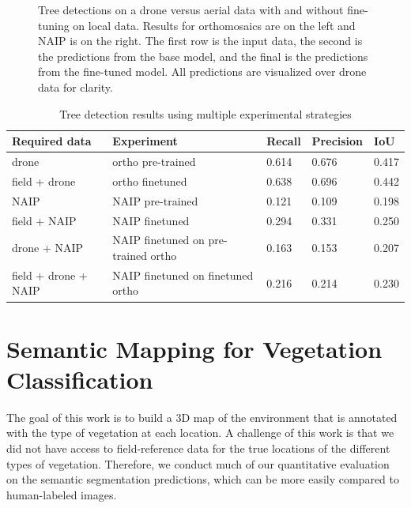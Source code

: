 \begin{figure}[H]
    \hfill
    \caption{Tree detections on a drone versus aerial data with and without fine-tuning on local data. Results for orthomosaics are on the left and NAIP is on the right. The first row is the input data, the second is the predictions from the base model, and the final is the predictions from the fine-tuned model. All predictions are visualized over drone data for clarity.
    }
    \label{fig:results:tree_det}
\end{figure}

\begin{table}[]
    \centering
    \begin{tabular}{|l|l|l|l|l|}
        \hline
        \textbf{Required data} & \textbf{Experiment} & \textbf{Recall} & \textbf{Precision} & \textbf{IoU} \\
        \hline \hline
        drone &  ortho pre-trained & 0.614 & 0.676 & 0.417\\ \hline 
        field + drone &  ortho finetuned & 0.638 & 0.696 & 0.442\\ \hline 
        NAIP &  NAIP pre-trained & 0.121 & 0.109 & 0.198\\ \hline 
        field + NAIP &  NAIP finetuned & 0.294 & 0.331 & 0.250\\ \hline 
        drone + NAIP & NAIP finetuned on pre-trained ortho  & 0.163 & 0.153 & 0.207\\ \hline 
        field + drone + NAIP &  NAIP finetuned on finetuned ortho & 0.216 & 0.214 & 0.230\\ \hline 
     \end{tabular}
    \caption{Tree detection results using multiple experimental strategies}
    \label{tab:results:tree_det}
\end{table}



\section{Semantic Mapping for Vegetation Classification}
The goal of this work is to build a 3D map of the environment that is annotated with the type of vegetation at each location. A challenge of this work is that we did not have access to field-reference data for the true locations of the different types of vegetation. Therefore, we conduct much of our quantitative evaluation on the semantic segmentation predictions, which can be more easily compared to human-labeled images. 

